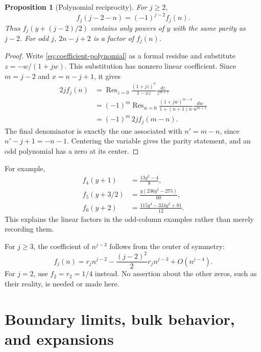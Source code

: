 \documentclass[11pt,letterpaper]{article}
\numberwithin{equation}{section}
\newtheorem{proposition}[theorem]{Proposition}
\theoremstyle{definition}
\DeclareMathOperator{\Res}{Res}
\begin{document}
\begin{proposition}[Polynomial reciprocity]\label{prop:reciprocity}
For $j\ge2$,
\begin{equation}\label{eq:reciprocity}
 f_j(j-2-n)=(-1)^{j-2}f_j(n).
\end{equation}
Thus $f_j(y+(j-2)/2)$ contains only powers of $y$ with the same parity as
$j-2$. For odd $j$, $2n-j+2$ is a factor of $f_j(n)$.
\end{proposition}
\begin{proof}
Write \eqref{eq:coefficient-polynomial} as a formal residue and substitute
$z=-w/(1+jw)$. This substitution has nonzero linear coefficient. Since
$m=j-2$ and $x=n-j+1$, it gives
\begin{align*}
 2j f_j(n)
 &=\Res_{z=0}\frac{(1+jz)^n}{1-xz}\frac{dz}{z^{m+1}}\\
 &=(-1)^m\Res_{w=0}
        \frac{(1+jw)^{m-n}}{1+(n+1)w}\frac{dw}{w^{m+1}}\\
 &=(-1)^m\,2j f_j(m-n).
\end{align*}
The final denominator is exactly the one associated with $n'=m-n$, since
$n'-j+1=-n-1$. Centering the variable gives the parity statement, and an
odd polynomial has a zero at its center.
\end{proof}

For example,
\begin{align*}
 f_4(y+1)&=\frac{13y^2-4}{8},\\
 f_5(y+3/2)&=\frac{y(236y^2-275)}{60},\\
 f_6(y+2)&=\frac{115y^4-324y^2+81}{12}.
\end{align*}
This explains the linear factors in the odd-column examples rather than
merely recording them.

For $j\ge3$, the coefficient of $n^{j-3}$ follows from the center of
symmetry:
\begin{equation}\label{eq:second-leading}
 f_j(n)=r_j n^{j-2}
       -\frac{(j-2)^2}{2}r_j n^{j-3}+O(n^{j-4}).
\end{equation}
For $j=2$, use $f_2=r_2=1/4$ instead. No assertion about the other zeros,
such as their reality, is needed or made here.

\section{Boundary limits, bulk behavior, and expansions}
\label{sec:asymptotics}
\end{document}

